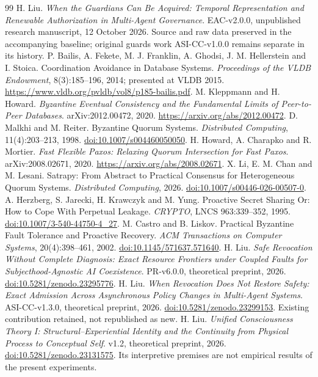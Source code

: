 \documentclass[11pt,a4paper]{article}
\theoremstyle{definition}\newtheorem{definition}{Definition}
\begin{document}
\begin{thebibliography}{99}\fontsize{9.3}{10.8}\selectfont\setlength{\itemsep}{1.5pt}\setlength{\parskip}{0pt}
 H. Liu. \emph{When the Guardians Can Be Acquired: Temporal Representation and Renewable Authorization in Multi-Agent Governance}. EAC-v2.0.0, unpublished research manuscript, 12 October 2026. Source and raw data preserved in the accompanying baseline; original guards work ASI-CC-v1.0.0 remains separate in its history.
 P. Bailis, A. Fekete, M. J. Franklin, A. Ghodsi, J. M. Hellerstein and I. Stoica. Coordination Avoidance in Database Systems. \emph{Proceedings of the VLDB Endowment}, 8(3):185--196, 2014; presented at VLDB 2015. \url{https://www.vldb.org/pvldb/vol8/p185-bailis.pdf}.
 M. Kleppmann and H. Howard. \emph{Byzantine Eventual Consistency and the Fundamental Limits of Peer-to-Peer Databases}. arXiv:2012.00472, 2020. \url{https://arxiv.org/abs/2012.00472}.
 D. Malkhi and M. Reiter. Byzantine Quorum Systems. \emph{Distributed Computing}, 11(4):203--213, 1998. \href{https://doi.org/10.1007/s004460050050}{doi:10.1007/s004460050050}.
 H. Howard, A. Charapko and R. Mortier. \emph{Fast Flexible Paxos: Relaxing Quorum Intersection for Fast Paxos}. arXiv:2008.02671, 2020. \url{https://arxiv.org/abs/2008.02671}.
 X. Li, E. M. Chan and M. Lesani. Satrapy: From Abstract to Practical Consensus for Heterogeneous Quorum Systems. \emph{Distributed Computing}, 2026. \href{https://doi.org/10.1007/s00446-026-00507-0}{doi:10.1007/s00446-026-00507-0}.
 A. Herzberg, S. Jarecki, H. Krawczyk and M. Yung. Proactive Secret Sharing Or: How to Cope With Perpetual Leakage. \emph{CRYPTO}, LNCS 963:339--352, 1995. \href{https://doi.org/10.1007/3-540-44750-4_27}{doi:10.1007/3-540-44750-4\_27}.
 M. Castro and B. Liskov. Practical Byzantine Fault Tolerance and Proactive Recovery. \emph{ACM Transactions on Computer Systems}, 20(4):398--461, 2002. \href{https://doi.org/10.1145/571637.571640}{doi:10.1145/571637.571640}.
 H. Liu. \emph{Safe Revocation Without Complete Diagnosis: Exact Resource Frontiers under Coupled Faults for Subjecthood-Agnostic AI Coexistence}. PR-v6.0.0, theoretical preprint, 2026. \href{https://doi.org/10.5281/zenodo.23295776}{doi:10.5281/zenodo.23295776}.
 H. Liu. \emph{When Revocation Does Not Restore Safety: Exact Admission Across Asynchronous Policy Changes in Multi-Agent Systems}. ASI-CC-v1.3.0, theoretical preprint, 2026. \href{https://doi.org/10.5281/zenodo.23299153}{doi:10.5281/zenodo.23299153}. Existing contribution retained, not republished as new.
 H. Liu. \emph{Unified Consciousness Theory I: Structural--Experiential Identity and the Continuity from Physical Process to Conceptual Self}. v1.2, theoretical preprint, 2026. \href{https://doi.org/10.5281/zenodo.23131575}{doi:10.5281/zenodo.23131575}. Its interpretive premises are not empirical results of the present experiments.
\end{thebibliography}
\end{document}
